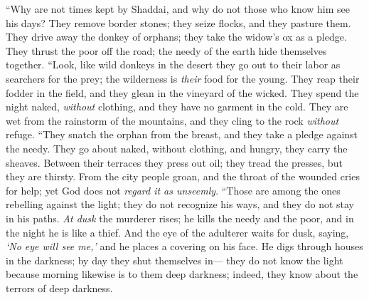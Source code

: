 \begin{biblechapter} %
 “Why are not times kept by Shaddai, 
and why do not those who know him see his days?
\verse They remove border stones; 
they seize flocks, and they pasture them.
\verse They drive away the donkey of orphans; 
they take the widow’s ox as a pledge.
\verse They thrust the poor off the road; 
the needy of the earth hide themselves together.
\verse “Look, like wild donkeys in the desert 
they go out to their labor as searchers for the prey; 
the wilderness is \textit{their} food for the young.
\verse They reap their fodder in the field, 
and they glean in the vineyard of the wicked.
\verse They spend the night naked, \textit{without} clothing, 
and they have no garment in the cold.
\verse They are wet from the rainstorm of the mountains, 
and they cling to the rock \textit{without} refuge.
\verse “They snatch the orphan from the breast, 
and they take a pledge against the needy.
\verse They go about naked, without clothing, 
and hungry, they carry the sheaves.
\verse Between their terraces they press out oil; 
they tread the presses, but they are thirsty.
\verse From the city people groan, 
and the throat of the wounded cries for help; 
yet God does not \textit{regard it as unseemly}.
\verse “Those are among the ones rebelling against the light; 
they do not recognize his ways, 
and they do not stay in his paths.
\verse \textit{At dusk} the murderer rises; 
he kills the needy and the poor, 
and in the night he is like a thief.
\verse And the eye of the adulterer waits for dusk, 
saying, \textit{‘No eye will see me,’} 
and he places a covering on his face.
\verse He digs through houses in the darkness; 
by day they shut themselves in— 
they do not know the light
\verse because morning likewise is to them deep darkness; 
indeed, they know about the terrors of deep darkness.

\end{biblechapter}
